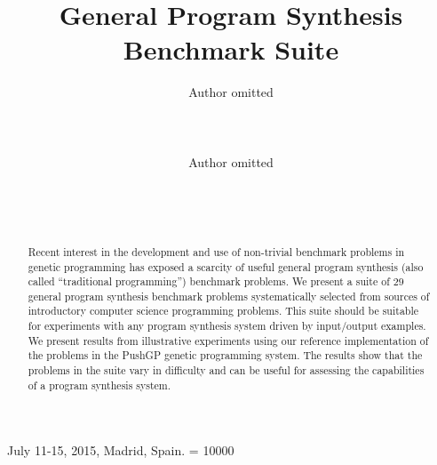 \documentclass{sig-alternate}
\begin{document}
%
 {July 11-15, 2015, Madrid, Spain.}
\widowpenalty = 10000

\title{General Program Synthesis Benchmark Suite}


\author{
\alignauthor
Author omitted\\
       \\
       \\
       \\
\alignauthor
Author omitted\\
       \\
       \\
       \\
}

\maketitle

\begin{abstract}
Recent interest in the development and use of non-trivial benchmark problems in genetic programming has exposed a scarcity of useful general program synthesis (also called ``traditional programming'') benchmark problems. 
We present a suite of $29$ general program synthesis benchmark problems systematically selected from sources of introductory computer science programming problems. 
This suite should be suitable for experiments with any program synthesis system driven by input/output examples. 
We present results from illustrative experiments using our reference implementation of the problems in the PushGP genetic programming system. The results show that the problems in the suite vary in difficulty and can be useful for assessing the capabilities of a program synthesis system.
\end{abstract}
\end{document}
